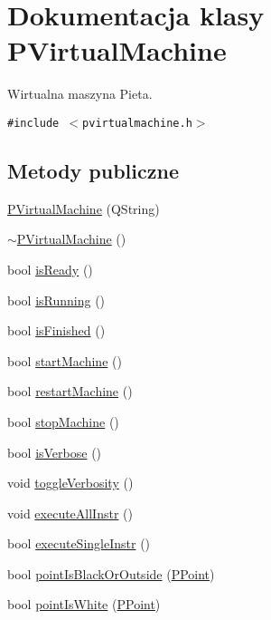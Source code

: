 \hypertarget{classPVirtualMachine}{
\section{Dokumentacja klasy PVirtualMachine}
\label{classPVirtualMachine}
}
Wirtualna maszyna Pieta.  


{\tt \#include $<$pvirtualmachine.h$>$}

\subsection*{Metody publiczne}
\begin{CompactItemize}
\item 
\hyperlink{classPVirtualMachine_0af0326622a3f47b6c2020413cdd3e05}{PVirtualMachine} (QString)
\item 
\hyperlink{classPVirtualMachine_4b24d240f1a45515cf4c8d4df932da62}{$\sim$PVirtualMachine} ()
\item 
bool \hyperlink{classPVirtualMachine_5132bedd5e8480185b48ea6c4783c770}{isReady} ()
\item 
bool \hyperlink{classPVirtualMachine_823195d3ae1615c791dfeb6c8d365a0e}{isRunning} ()
\item 
bool \hyperlink{classPVirtualMachine_6b19e3e51a584b13e79c44fc5b842c2b}{isFinished} ()
\item 
bool \hyperlink{classPVirtualMachine_4b6bb128d63569e855684128b5e09f1c}{startMachine} ()
\item 
bool \hyperlink{classPVirtualMachine_f4cdf5d80b7a169e2dfdebffe2588e4b}{restartMachine} ()
\item 
bool \hyperlink{classPVirtualMachine_fa30f1871832c1af18519db03c397ac0}{stopMachine} ()
\item 
bool \hyperlink{classPVirtualMachine_219cd1d08de6d3d5a9117eecc5348d9c}{isVerbose} ()
\item 
void \hyperlink{classPVirtualMachine_1e48dcf68b3b80d7f6d3c67b3f796e51}{toggleVerbosity} ()
\item 
void \hyperlink{classPVirtualMachine_40e1780e122ce7fe4ebadc526c47fbea}{executeAllInstr} ()
\item 
bool \hyperlink{classPVirtualMachine_7bbb22aabe782de2208139bc01f65050}{executeSingleInstr} ()
\item 
bool \hyperlink{classPVirtualMachine_6daa9fea05af4bfc30b881c893fbd725}{pointIsBlackOrOutside} (\hyperlink{structstruct__point}{PPoint})
\item 
bool \hyperlink{classPVirtualMachine_cae537f70c35487220818e8d18978e07}{pointIsWhite} (\hyperlink{structstruct__point}{PPoint})

\end{CompactItemize}
